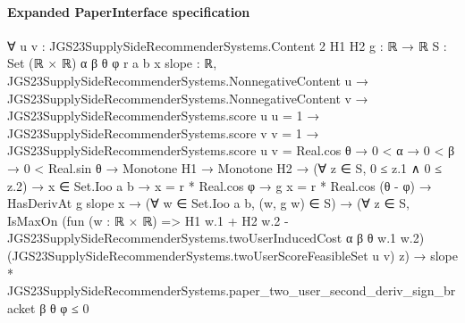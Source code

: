 \documentclass[10pt]{article}
\begin{document}
\paragraph{Expanded PaperInterface specification}
\begin{ReviewVerbatim}
∀ {u v : JGS23SupplySideRecommenderSystems.Content 2} {H1 H2 g : ℝ → ℝ} {S : Set (ℝ × ℝ)} {α β θ φ r a b x slope : ℝ},
  JGS23SupplySideRecommenderSystems.NonnegativeContent u →
    JGS23SupplySideRecommenderSystems.NonnegativeContent v →
      JGS23SupplySideRecommenderSystems.score u u = 1 →
        JGS23SupplySideRecommenderSystems.score v v = 1 →
          JGS23SupplySideRecommenderSystems.score u v = Real.cos θ →
            0 < α →
              0 < β →
                0 < Real.sin θ →
                  Monotone H1 →
                    Monotone H2 →
                      (∀ z ∈ S, 0 ≤ z.1 ∧ 0 ≤ z.2) →
                        x ∈ Set.Ioo a b →
                          x = r * Real.cos φ →
                            g x = r * Real.cos (θ - φ) →
                              HasDerivAt g slope x →
                                (∀ w ∈ Set.Ioo a b, (w, g w) ∈ S) →
                                  (∀ z ∈ S,
                                      IsMaxOn
                                        (fun (w : ℝ × ℝ) =>
                                          H1 w.1 + H2 w.2 -
                                            JGS23SupplySideRecommenderSystems.twoUserInducedCost α β θ w.1 w.2)
                                        (JGS23SupplySideRecommenderSystems.twoUserScoreFeasibleSet u v) z) →
                                    slope *
                                        JGS23SupplySideRecommenderSystems.paper_two_user_second_deriv_sign_bracket β θ
                                          φ ≤
                                      0
\end{ReviewVerbatim}
\end{document}
